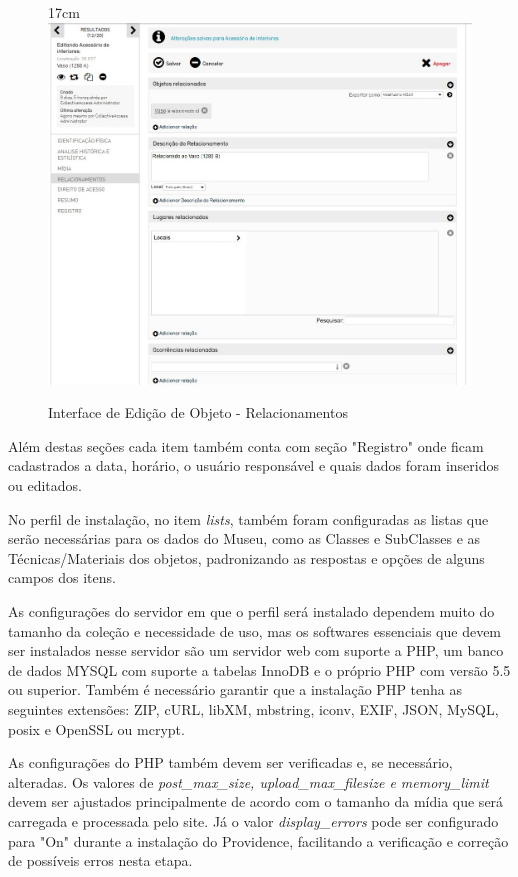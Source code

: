 \documentclass[a4paper,12pt,oneside,onecolumn,final,fleqn]{repUERJ}
\begin{document}
\begin{figure}[!ht]{17cm}
	\includegraphics[width=15cm, center]{figuras/Tela_Relac.jpg}
	\caption{Interface de Edição de Objeto - Relacionamentos} \label{fig:Tela_rel}
\end{figure}

Além destas seções cada item também conta com seção "Registro" onde ficam cadastrados a data, horário, o usuário responsável e quais dados foram inseridos ou editados.

No perfil de instalação, no item \textit{lists}, também foram configuradas as listas que serão necessárias para os dados do Museu, como as Classes e SubClasses e as Técnicas/Materiais dos objetos, padronizando as respostas e opções de alguns campos dos itens.

As configurações do servidor em que o perfil será instalado dependem muito do tamanho da coleção e necessidade de uso, mas os softwares essenciais que devem ser instalados nesse servidor são um servidor web com suporte a PHP, um banco de dados MYSQL com suporte a tabelas InnoDB e o próprio PHP com versão 5.5 ou superior. Também é necessário garantir que a instalação PHP tenha as seguintes extensões: ZIP, cURL, libXM, mbstring, iconv, EXIF, JSON, MySQL, posix e OpenSSL ou mcrypt.

As configurações do PHP também devem ser verificadas e, se necessário, alteradas. Os valores de \textit{post\_max\_size, upload\_max\_filesize e memory\_limit} devem ser ajustados principalmente de acordo com o tamanho da mídia que será carregada e processada pelo site. Já o valor \textit{display\_errors} pode ser configurado para "On" durante a instalação do Providence, facilitando a verificação e correção de possíveis erros nesta etapa.
\end{document}
